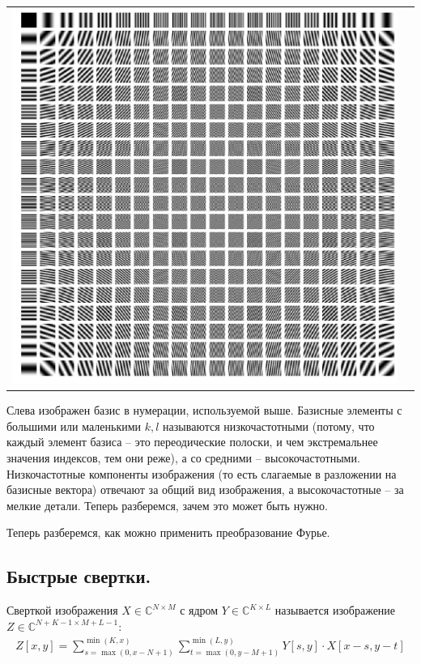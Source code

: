 \documentclass[]{book}
\theoremstyle{definition}
\begin{document}
\begin{center}
    \begin{table}[h]
        \centering
        \begin{tabular}{cc}
            \includegraphics[scale=0.2]{images/fourier_basis.jpg}
        \end{tabular}
    \end{table}
\end{center}

Слева изображен базис в нумерации, используемой выше. Базисные элементы с большими или маленькими $k, l$ называются низкочастотными (потому, что каждый элемент базиса -- это переодические полоски, и чем экстремальнее значения индексов, тем они реже), а со средними -- высокочастотными. Низкочастотные компоненты изображения (то есть слагаемые в разложении на базисные вектора) отвечают за общий вид изображения, а высокочастотные -- за мелкие детали. Теперь разберемся, зачем это может быть нужно.

Теперь разберемся, как можно применить преобразование Фурье.

\subsection*{Быстрые свертки.}
    Сверткой изображения $X \in \mathbb{C}^{N \times M}$ с ядром $Y \in \mathbb{C}^{K \times L}$ называется изображение $Z \in \mathbb{C}^{N + K - 1 \times M + L - 1}$:
    \begin{gather*}
        Z[x, y] = \sum\limits_{s = \max(0, x - N + 1)}^{\min(K, x)}\sum\limits_{t = \max(0, y - M + 1)}^{\min(L, y)} Y[s, y] \cdot X[x - s, y - t]
    \end{gather*}
    
\end{document}
